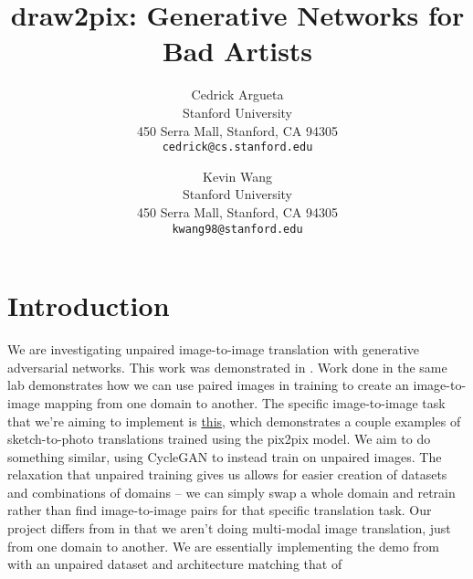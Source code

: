 \documentclass[10pt,twocolumn,letterpaper]{article}
\begin{document}
\title{draw2pix: Generative Networks for Bad Artists}

\author{Cedrick Argueta\\
Stanford University\\
450 Serra Mall, Stanford, CA 94305\\
{\tt\small cedrick@cs.stanford.edu}
\and
Kevin Wang\\
Stanford University\\
450 Serra Mall, Stanford, CA 94305\\
{\tt\small kwang98@stanford.edu}
}

\maketitle

\section{Introduction}
We are investigating unpaired image-to-image translation with generative adversarial networks.
This work was demonstrated in \cite{cycleGAN}.
Work done in the same lab \cite{pix2pix} demonstrates how we can use paired images in training to create an image-to-image mapping from one domain to another.
The specific image-to-image task that we're aiming to implement is \href{https://affinelayer.com/pixsrv/}{this}, which demonstrates a couple examples of sketch-to-photo translations trained using the pix2pix model.
We aim to do something similar, using CycleGAN to instead train on unpaired images.
The relaxation that unpaired training gives us allows for easier creation of datasets and combinations of domains -- we can simply swap a whole domain and retrain rather than find image-to-image pairs for that specific translation task.
Our project differs from \cite{bicyclegan} in that we aren't doing multi-modal image translation, just from one domain to another. 
We are essentially implementing the demo from \cite{pix2pix} with an unpaired dataset and architecture matching that of \cite{cycleGAN}
\end{document}
